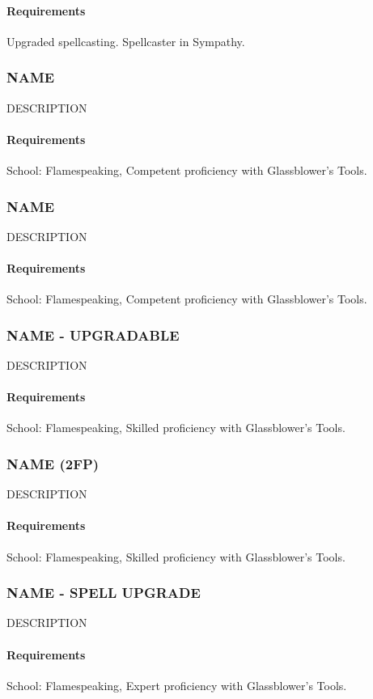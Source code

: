    \paragraph{Requirements} Upgraded spellcasting. Spellcaster in Sympathy.

\subsubsection{NAME} \label{feat::name}
    DESCRIPTION
    \paragraph{Requirements} School: Flamespeaking, Competent proficiency with Glassblower's Tools.
\subsubsection{NAME} \label{feat::name}
    DESCRIPTION
    \paragraph{Requirements} School: Flamespeaking, Competent proficiency with Glassblower's Tools.
\subsubsection{NAME - UPGRADABLE} \label{feat::name}
    DESCRIPTION
    \paragraph{Requirements} School: Flamespeaking, Skilled proficiency with Glassblower's Tools.
\subsubsection{NAME (2FP)} \label{feat::name}
    DESCRIPTION
    \paragraph{Requirements} School: Flamespeaking, Skilled proficiency with Glassblower's Tools.
\subsubsection{NAME - SPELL UPGRADE} \label{feat::name}
    DESCRIPTION
    \paragraph{Requirements} School: Flamespeaking, Expert proficiency with Glassblower's Tools.
